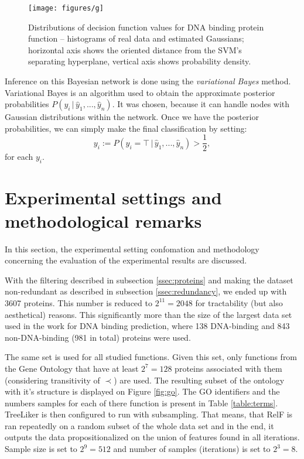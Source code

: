 \documentclass[11pt,twoside,a4paper]{book}
\begin{document}
\begin{figure}[h]
\begin{center}
\texttt{[image: figures/g]}
\caption[Probability distributions of decision function values for DNA binding]{Distributions of decision function values for DNA binding protein function -- histograms of real data and estimated Gaussians;
horizontal axis shows the oriented distance from the SVM's separating hyperplane, vertical axis shows probability density.}
\label{fig:gaussians}
\end{center}
\end{figure}

Inference on this Bayesian network is done using the \emph{variational Bayes} \cite{varb} method.
Variational Bayes is an algorithm used to
obtain the approximate posterior probabilities $P(y_i \, | \, \hat{y}_1, ..., \hat{y}_n).$
It was chosen, because it can handle nodes with Gaussian distributions within the network.
Once we have the posterior probabilities, 
we can simply make the final classification by setting:
\[ y_i := P(y_i = \top \, | \, \hat{y}_1, ..., \hat{y}_n) > \frac{1}{2}, \]
for each $y_i$.

\section{Experimental settings and methodological remarks}
In this section, the experimental setting confomation and
methodology concerning the evaluation
of the experimental results are discussed.

With the filtering described in subsection \ref{ssec:proteins}
and making the dataset non-redundant as described in subsection \ref{ssec:redundancy},
we ended up with 3607 proteins.
This number is reduced to $2^{11} = 2048$ for tractability (but also aesthetical) reasons. 
This significantly more than the size of the largest data set used in the work
\cite{szabova} for DNA binding prediction,
where 138 DNA-binding and 843 non-DNA-binding (981 in total) proteins were used.

The same set is used for all studied functions.
Given this set, only functions from the Gene Ontology that have at least $2^7 = 128$
proteins associated with them (considering transitivity of $\prec$) are used.
The resulting subset of the ontology with it's structure is displayed on Figure \ref{fig:go}.
The GO identifiers and the numbers samples for each of there function is present in Table \ref{table:terms}.  
TreeLiker is then configured to run with subsampling.
That means, that RelF is ran repeatedly on a random subset of the whole data set
and in the end, it outputs the data propositionalized on the
union of features found in all iterations.
Sample size is set to $2^9=512$ and number of samples (iterations) is set to $2^3=8$.
\end{document}
